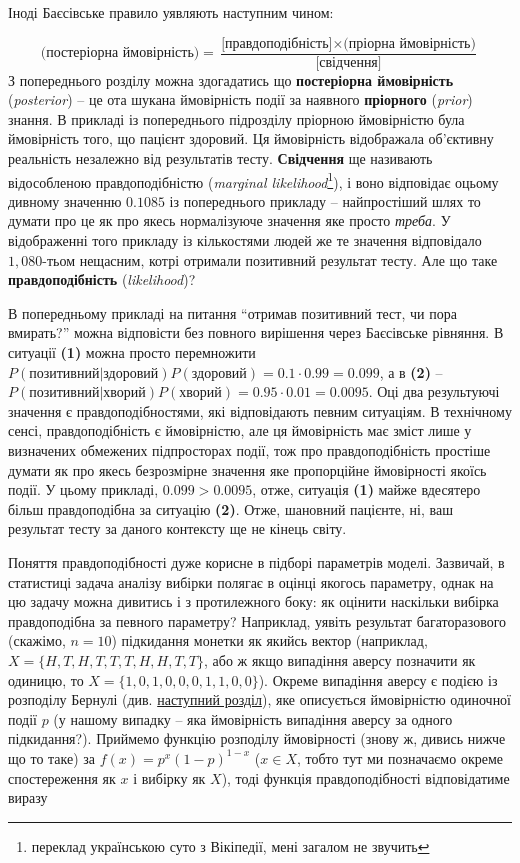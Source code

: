 \documentclass[
  11pt,
]{book}
\begin{document}
Іноді Баєсівське правило уявляють наступним чином:

\[\text{(постеріорна ймовірність)} = \frac{\text{[правдоподібність]} \times \text{(пріорна ймовірність)}}{\text{[свідчення]}}\]
З попереднього розділу можна здогадатись що \textbf{постеріорна ймовірність} (\emph{posterior}) -- це ота шукана ймовірність події за наявного \textbf{пріорного} (\emph{prior}) знання. В прикладі із попереднього підрозділу пріорною ймовірністю була ймовірність того, що пацієнт здоровий. Ця ймовірність відображала об'єктивну реальність незалежно від результатів тесту. \textbf{Свідчення} ще називають відособленою правдоподібністю (\emph{marginal likelihood}\footnote{переклад українською суто з Вікіпедії, мені загалом не звучить}), і воно відповідає оцьому дивному значенню \(0.1085\) із попереднього прикладу -- найпростіший шлях то думати про це як про якесь нормалізуюче значення яке просто \emph{треба}. У відображенні того прикладу із кількостями людей же те значення відповідало \(1,080\)-тьом нещасним, котрі отримали позитивний результат тесту. Але що таке \textbf{правдоподібність} (\emph{likelihood})?

В попередньому прикладі на питання ``отримав позитивний тест, чи пора вмирать?'' можна відповісти без повного вирішення через Баєсівське рівняння. В ситуації \textbf{(1)} можна просто перемножити \(P(\text{позитивний|здоровий})P(\text{здоровий}) = 0.1 \cdot 0.99 = 0.099\), а в \textbf{(2)} -- \(P(\text{позитивний|хворий})P(\text{хворий}) = 0.95 \cdot 0.01 = 0.0095\). Оці два результуючі значення є правдоподібностями, які відповідають певним ситуаціям. В технічному сенсі, правдоподібність є ймовірністю, але ця ймовірність має зміст лише у визначених обмежених підпросторах події, тож про правдоподібність простіше думати як про якесь безрозмірне значення яке пропорційне ймовірності якоїсь події. У цьому прикладі, \(0.099 > 0.0095\), отже, ситуація \textbf{(1)} майже вдесятеро більш правдоподібна за ситуацію \textbf{(2)}. Отже, шановний пацієнте, ні, ваш результат тесту за даного контексту ще не кінець світу.

Поняття правдоподібності дуже корисне в підборі параметрів моделі. Зазвичай, в статистиці задача аналізу вибірки полягає в оцінці якогось параметру, однак на цю задачу можна дивитись і з протилежного боку: як оцінити наскільки вибірка правдоподібна за певного параметру? Наприклад, уявіть результат багаторазового (скажімо, \(n = 10\)) підкидання монетки як якийсь вектор (наприклад, \(X = \{H, T, H, T, T, T, H, H, T, T\}\), або ж якщо випадіння аверсу позначити як одиницю, то \(X = \{1, 0, 1, 0, 0, 0, 1, 1, 0, 0\}\)). Окреме випадіння аверсу є подією із розподілу Бернулі (див. \hyperref[pdfs]{наступний розділ}), яке описується ймовірністю одиночної події \(p\) (у нашому випадку -- яка ймовірність випадіння аверсу за одного підкидання?). Приймемо функцію розподілу ймовірності (знову ж, дивись нижче що то таке) за \(f(x) = p^x (1-p)^{1-x}\) (\(x \in X\), тобто тут ми позначаємо окреме спостереження як \(x\) і вибірку як \(X\)), тоді функція правдоподібності відповідатиме виразу
\end{document}
